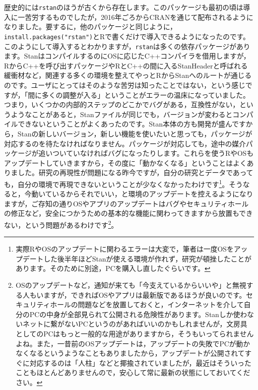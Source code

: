 \documentclass{ltjsbook}
\begin{document}
歴史的には\verb|rstan|のほうが古くから存在します。このパッケージも最初の頃は導入に一苦労するものでしたが，2016年ごろからCRANを通じて配布されるようになりました。要するに，他のパッケージと同じように，\verb|install.packages("rstan")|とRで書くだけで導入できるようになったのです。このようにして導入するとわかりますが，\verb|rstan|は多くの依存パッケージがあります。StanはコンパイルするのにOSに応じたC++コンパイラを借用しますが，RからC++を呼び出すパッケージやRとC++の間に入るStanHeaderと呼ばれる緩衝材など，関連する多くの環境を整えてやっとRからStanへのルートが通じるのです。ユーザにとってはそのような苦労は知ったことではない，という感じですが，「間に多くの調整が入る」ということがエラーの温床になっていました。つまり，いくつかの内部的ステップのどこかでバグがある，互換性がない，というようなことがあると，Stanファイルが同じでも，バージョンが変わるとコンパイルできないということがよくあったのです。Stan本体の方も開発が盛んですから，Stanの新しいバージョン，新しい機能を使いたいと思っても，パッケージが対応するのを待たなければなりません。パッケージが対応しても，途中の媒介パッケージが追いついていなければバグになったりします。これらを使うRやOSもアップデートしていきますから，その度に「動かなくなる」ということはよくありました。研究の再現性が問題になる昨今ですが，自分の研究とデータであっても，自分の環境で再現できないということが少なくなかったわけです\footnote{実際RやOSのアップデートに関わるエラーは大変で，筆者は一度OSをアップデートした後半年ほどStanが使える環境が作れず，研究が頓挫したことがあります。そのために別途，PCを購入し直したぐらいです。}。そうなると，今動いているからそれでいい，と環境のアップデートを控えるようになりますが，ご存知の通りOSやアプリのアップデートはバグやセキュリティホールの修正など，安全につかうための基本的な機能に関わってきますから放置もできない，という問題があるわけです\footnote{OSのアップデートなど，通知が来ても「今支えているからいいや」と無視する人もいますが，できればOSやアプリは最新版であるほうが良いのです。セキュリティホールの問題などを放置しておくと，インターネットを介して自分のPCの中身が全部見られて公開される危険性があります。Stanしか使わないネットに繋がないPCというのがあればいいのかもしれませんが，文房具としてのPCはもっと一般的な用途がありますから，そうもいってられませんよね。また，一昔前のOSアップデートは，アップデートの失敗でPCが動かなくなるというようなこともありましたから，アップデートが公開されてすぐに対応するのは「人柱」などと揶揄されていましたが，最近はそういったこともほとんどありませんので，安心して常に最新の状態にしておいてください。}。
\end{document}
